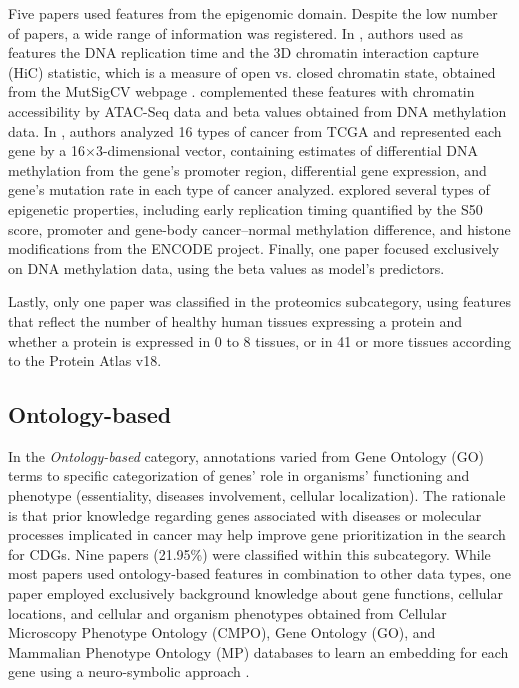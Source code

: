 Five papers \cite{Tokheim2016, Celli2018, Jiang2019, Schulte-Sasse2019, Lyu2020} used features from the epigenomic domain. Despite the low number of papers, a wide range of information was registered. In \citet{Tokheim2016}, authors used as features the DNA replication time and the 3D chromatin interaction capture (HiC) statistic, which is a measure of open vs. closed chromatin state, obtained from the MutSigCV webpage \cite{lawrence2013mutational}. \citet{Jiang2019} complemented these features with chromatin accessibility by ATAC-Seq data and beta values obtained from DNA methylation data. 
In \citet{Schulte-Sasse2019}, authors analyzed 16 types of cancer from TCGA and represented each gene by a 16$\times$3-dimensional vector, containing estimates of differential DNA methylation from the gene's promoter region, differential gene expression, and gene's mutation rate in each type of cancer analyzed. \citet{Lyu2020} explored several types of epigenetic properties, including early replication timing quantified by the S50 score, promoter and gene-body cancer–normal methylation difference, and histone modifications from the ENCODE project. Finally, one paper \cite{Celli2018} focused exclusively on DNA methylation data, using the beta values as model's predictors.

Lastly, only one paper \cite{Nulsen2021} was classified in the proteomics subcategory, using features that reflect the number of healthy human tissues expressing a protein and whether a protein is expressed in 0 to 8 tissues, or in 41 or more tissues according to the Protein Atlas v18.

\subsection{Ontology-based}

In the \textit{Ontology-based} category, annotations varied from Gene Ontology (GO) terms to specific categorization of genes' role in organisms' functioning and phenotype (\eg essentiality, diseases involvement, cellular localization). The rationale is that prior knowledge regarding genes associated with diseases or molecular processes implicated in cancer may help improve gene prioritization in the search for CDGs. Nine papers (21.95\%) were classified within this subcategory. While most papers used ontology-based features in combination to other data types, one paper employed exclusively background knowledge about gene functions, cellular locations, and cellular and organism phenotypes obtained from Cellular Microscopy Phenotype Ontology (CMPO), Gene Ontology (GO), and Mammalian Phenotype Ontology (MP) databases to learn an embedding for each gene using a neuro-symbolic approach \cite{Althubaiti2019}. 


